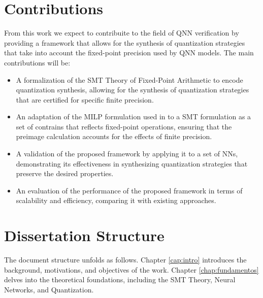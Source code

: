 \section{Contributions}\label{sec:contributions}
From this work we expect to contribuite to the field of QNN verification by providing a framework that allows for the synthesis of quantization strategies that take into account the fixed-point precision used by QNN models. The main contributions will be:
\begin{itemize}
    \item A formalization of the SMT Theory of Fixed-Point Arithmetic to encode quantization synthesis, allowing for the synthesis of quantization strategies that are certified for specific finite precision.
    \item An adaptation of the MILP formulation used in \cite{cai2025certified} to a SMT formulation as a set of contrains that reflects fixed-point operations, ensuring that the preimage calculation accounts for the effects of finite precision.
    \item A validation of the proposed framework by applying it to a set of NNs, demonstrating its effectiveness in synthesizing quantization strategies that preserve the desired properties.
    \item An evaluation of the performance of the proposed framework in terms of scalability and efficiency, comparing it with existing approaches.
\end{itemize}   

\section{Dissertation Structure}\label{sec:dissertation_structure}

The document structure unfolds as follows. Chapter \ref{cap:intro} introduces the background, motivations, and objectives of the work. Chapter \ref{chap:fundamentos} delves into the theoretical foundations, including the SMT Theory, Neural Networks, and Quantization.


